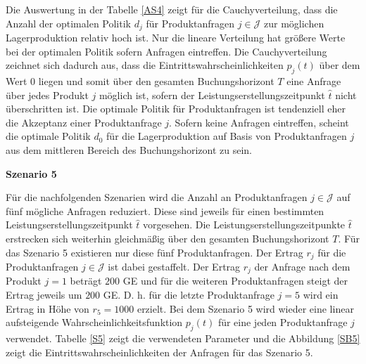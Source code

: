 Die Auswertung in der Tabelle \ref{AS4} zeigt für die Cauchyverteilung, dass die Anzahl der optimalen Politik $d_j$ für Produktanfragen $j\in\mathcal{J}$ zur möglichen Lagerproduktion relativ hoch ist. Nur die lineare Verteilung hat größere Werte bei der optimalen Politik sofern Anfragen eintreffen. Die Cauchyverteilung zeichnet sich dadurch aus, dass die Eintrittswahrscheinlichkeiten $p_j(t)$ über dem Wert $0$ liegen und somit über den gesamten Buchungshorizont $T$ eine Anfrage über jedes Produkt $j$ möglich ist, sofern der Leistungserstellungszeitpunkt $\hat t$ nicht überschritten ist. Die optimale Politik für Produktanfragen ist tendenziell eher die Akzeptanz einer Produktanfrage $j$. Sofern keine Anfragen eintreffen, scheint die optimale Politik $d_0$ für die Lagerproduktion auf Basis von Produktanfragen $j$ aus dem mittleren Bereich des Buchungshorizont zu sein.

\textbf{Szenario 5}

Für die nachfolgenden Szenarien wird die Anzahl an Produktanfragen $j\in\mathcal{J}$ auf fünf mögliche Anfragen reduziert. Diese sind jeweils für einen bestimmten Leistungserstellungszeitpunkt $\hat t$ vorgesehen. Die Leistungserstellungszeitpunkte $\hat t$ erstrecken sich weiterhin gleichmäßig über den gesamten Buchungshorizont $T$. Für das Szenario 5 existieren nur diese fünf Produktanfragen. Der Ertrag $r_j$ für die Produktanfragen $j\in\mathcal{J}$ ist dabei gestaffelt. Der Ertrag $r_j$ der Anfrage nach dem Produkt $j=1$ beträgt $200$ GE und für die weiteren Produktanfragen steigt der Ertrag jeweils um $200$ GE. D. h. für die letzte Produktanfrage $j=5$ wird ein Ertrag in Höhe von $r_5=1000$ erzielt. Bei dem Szenario 5 wird wieder eine linear aufsteigende Wahrscheinlichkeitsfunktion $p_j(t)$ für eine jeden Produktanfrage $j$ verwendet. Tabelle \ref{S5} zeigt die verwendeten Parameter und die Abbildung \ref{SB5} zeigt die Eintrittswahrscheinlichkeiten der Anfragen für das Szenario 5.

